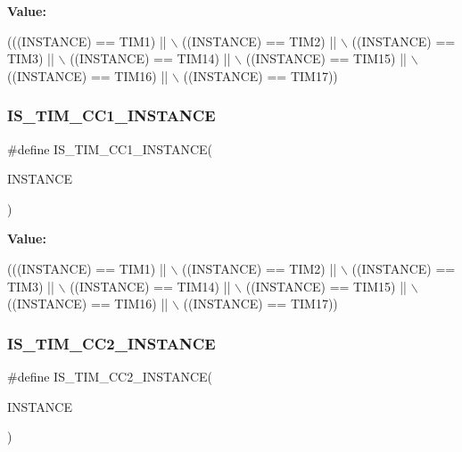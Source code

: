 {\bfseries Value\+:}
\begin{DoxyCode}
(((INSTANCE) == TIM1)    || \(\backslash\)
   ((INSTANCE) == TIM2)    || \(\backslash\)
   ((INSTANCE) == TIM3)    || \(\backslash\)
   ((INSTANCE) == TIM14)   || \(\backslash\)
   ((INSTANCE) == TIM15)   || \(\backslash\)
   ((INSTANCE) == TIM16)   || \(\backslash\)
   ((INSTANCE) == TIM17))
\end{DoxyCode}
\mbox{\label{group___exported__macro_ga0c02efc77b1bfb640d7f6593f58ad464}} 
\subsubsection{\texorpdfstring{I\+S\+\_\+\+T\+I\+M\+\_\+\+C\+C1\+\_\+\+I\+N\+S\+T\+A\+N\+CE}{IS\_TIM\_CC1\_INSTANCE}\hspace{0.1cm}{\footnotesize\ttfamily [16/16]}}
{\footnotesize\ttfamily \#define I\+S\+\_\+\+T\+I\+M\+\_\+\+C\+C1\+\_\+\+I\+N\+S\+T\+A\+N\+CE(\begin{DoxyParamCaption}\item[{}]{I\+N\+S\+T\+A\+N\+CE }\end{DoxyParamCaption})}

{\bfseries Value\+:}
\begin{DoxyCode}
(((INSTANCE) == TIM1)    || \(\backslash\)
   ((INSTANCE) == TIM2)    || \(\backslash\)
   ((INSTANCE) == TIM3)    || \(\backslash\)
   ((INSTANCE) == TIM14)   || \(\backslash\)
   ((INSTANCE) == TIM15)   || \(\backslash\)
   ((INSTANCE) == TIM16)   || \(\backslash\)
   ((INSTANCE) == TIM17))
\end{DoxyCode}
\mbox{\label{group___exported__macro_ga6ef84d278cf917c7e420b94687b39c7c}} 
\subsubsection{\texorpdfstring{I\+S\+\_\+\+T\+I\+M\+\_\+\+C\+C2\+\_\+\+I\+N\+S\+T\+A\+N\+CE}{IS\_TIM\_CC2\_INSTANCE}\hspace{0.1cm}{\footnotesize\ttfamily [1/16]}}
{\footnotesize\ttfamily \#define I\+S\+\_\+\+T\+I\+M\+\_\+\+C\+C2\+\_\+\+I\+N\+S\+T\+A\+N\+CE(\begin{DoxyParamCaption}\item[{}]{I\+N\+S\+T\+A\+N\+CE }\end{DoxyParamCaption})}

